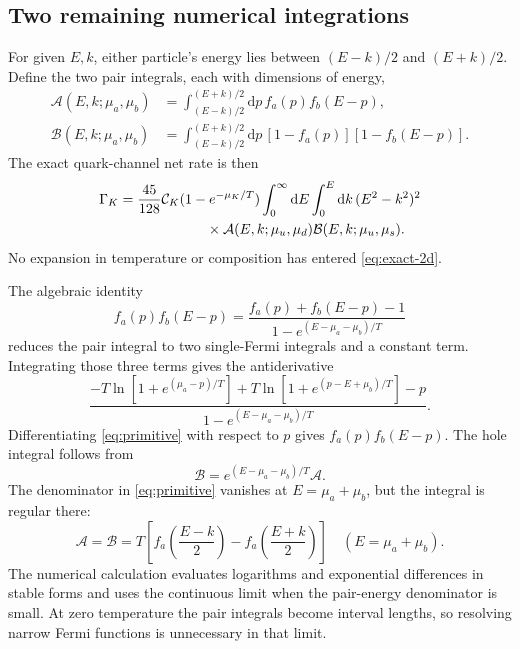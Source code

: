 \documentclass[11pt,letterpaper]{article}
\numberwithin{equation}{section}
\newcommand{\dd}{\mathrm d}
\newcommand{\CK}{\mathcal C_K}
\begin{document}
\subsection{Two remaining numerical integrations}
For given \(E,k\), either particle's energy lies between \((E-k)/2\) and \((E+k)/2\).
Define the two pair integrals, each with dimensions of energy,
\begin{align}
 \mathcal A(E,k;\mu_a,\mu_b)
 &=\int_{(E-k)/2}^{(E+k)/2}\dd p\,
 f_a(p)f_b(E-p),\label{eq:pair-occupied}\\
 \mathcal B(E,k;\mu_a,\mu_b)
 &=\int_{(E-k)/2}^{(E+k)/2}\dd p\,
 [1-f_a(p)][1-f_b(E-p)].\label{eq:pair-holes}
\end{align}
The exact quark-channel net rate is then
\begin{align}
 \Gamma_K
 &=\frac{45}{128}\CK(1-e^{-\mu_K/T})
 \int_0^\infty\dd E\int_0^E\dd k\,(E^2-k^2)^2\notag\\
 &\hspace{22mm}\times
 \mathcal A(E,k;\mu_u,\mu_d)
 \mathcal B(E,k;\mu_u,\mu_s).
 \label{eq:exact-2d}
\end{align}
No expansion in temperature or composition has entered \cref{eq:exact-2d}.

The algebraic identity
\begin{equation}
 f_a(p)f_b(E-p)=
 \frac{f_a(p)+f_b(E-p)-1}{1-e^{(E-\mu_a-\mu_b)/T}}
 \label{eq:pair-product-identity}
\end{equation}
reduces the pair integral to two single-Fermi integrals and a constant term.
Integrating those three terms gives the antiderivative
\begin{equation}
 \frac{-T\ln[1+e^{(\mu_a-p)/T}]
       +T\ln[1+e^{(p-E+\mu_b)/T}]-p}
      {1-e^{(E-\mu_a-\mu_b)/T}}.
 \label{eq:primitive}
\end{equation}
Differentiating \cref{eq:primitive} with respect to \(p\) gives \(f_a(p)f_b(E-p)\).
The hole integral follows from
\begin{equation}
 \mathcal B=e^{(E-\mu_a-\mu_b)/T}\mathcal A.
 \label{eq:pair-balance}
\end{equation}
The denominator in \cref{eq:primitive} vanishes at \(E=\mu_a+\mu_b\), but the integral is regular there:
\begin{equation}
 \mathcal A=\mathcal B
 =T\left[f_a\!\left(\frac{E-k}{2}\right)
         -f_a\!\left(\frac{E+k}{2}\right)\right]
 \quad(E=\mu_a+\mu_b).
 \label{eq:removable}
\end{equation}
The numerical calculation evaluates logarithms and exponential differences in stable forms and uses the continuous limit when the pair-energy denominator is small.
At zero temperature the pair integrals become interval lengths, so resolving narrow Fermi functions is unnecessary in that limit.
\end{document}
